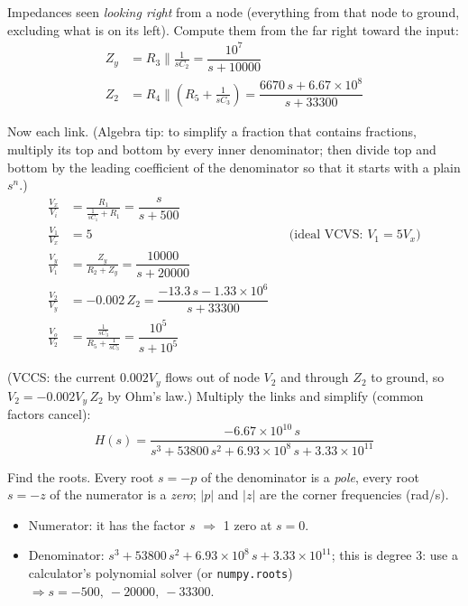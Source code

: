 \documentclass[11pt]{article}
\newcommand{\solstep}[2]{\par\medskip{\color{stepc}\textbf{Step #1 --- #2}}\par\nopagebreak}
\begin{document}
Impedances seen \emph{looking right} from a node (everything from that node to ground, excluding what is on its left). Compute them from the far right toward the input:
\begin{align*}
Z_{y} &= R_{3} \parallel \frac{1}{sC_{2}} = \dfrac{10^{7}}{s + 10000} \\
Z_{2} &= R_{4} \parallel \left(R_{5} + \frac{1}{sC_{3}}\right) = \dfrac{6670\,s + 6.67\times 10^{8}}{s + 33300}
\end{align*}

Now each link. {\small (Algebra tip: to simplify a fraction that contains fractions, multiply its top and bottom by every inner denominator; then divide top and bottom by the leading coefficient of the denominator so that it starts with a plain $s^n$.)}
\begin{align*}
\frac{V_{x}}{V_{i}} &= \frac{R_{1}}{\frac{1}{sC_{1}} + R_{1}} = \dfrac{s}{s + 500} \\
\frac{V_{1}}{V_{x}} &= 5 &&\text{(ideal VCVS: $V_{1} = 5V_{x}$)} \\
\frac{V_{y}}{V_{1}} &= \frac{Z_{y}}{R_{2} + Z_{y}} = \dfrac{10000}{s + 20000} \\
\frac{V_{2}}{V_{y}} &= -0.002\,Z_{2} = \dfrac{-13.3\,s - 1.33\times 10^{6}}{s + 33300} \\
\frac{V_{o}}{V_{2}} &= \frac{\frac{1}{sC_{3}}}{R_{5} + \frac{1}{sC_{3}}} = \dfrac{10^{5}}{s + 10^{5}}
\end{align*}

(VCCS: the current $0.002V_{y}$ flows out of node $V_{2}$ and through $Z_{2}$ to ground, so $V_{2} = -0.002V_{y}\,Z_{2}$ by Ohm's law.)
Multiply the links and simplify (common factors cancel):\[
H(s) = \dfrac{-6.67\times 10^{10}\,s}{s^{3} + 53800\,s^{2} + 6.93\times 10^{8}\,s + 3.33\times 10^{11}}
\]

\solstep{5}{Standard (Bode-ready) form}Find the roots. Every root $s=-p$ of the denominator is a \emph{pole}, every root $s=-z$ of the numerator is a \emph{zero}; $|p|$ and $|z|$ are the corner frequencies (rad/s).
\begin{itemize}[leftmargin=*,itemsep=2pt]
\item Numerator: it has the factor $s$ $\Rightarrow$ 1 zero at $s=0$.
\item Denominator: $s^{3} + 53800\,s^{2} + 6.93\times 10^{8}\,s + 3.33\times 10^{11}$; this is degree 3: use a calculator's polynomial solver (or \texttt{numpy.roots}) $\Rightarrow s = -500,\ -20000,\ -33300$.
\end{itemize}
\end{document}
